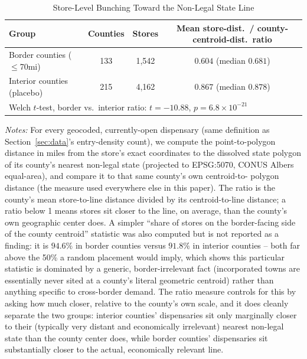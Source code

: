 \begin{table}[htbp]
\centering
\caption{Store-Level Bunching Toward the Non-Legal State Line}
\label{tab:border_bunching}
\begin{tabular}{lccc}
\toprule
Group & Counties & Stores & Mean store-dist.\ / county-centroid-dist.\ ratio \\
\midrule
Border counties ($\le$70mi) & 133 & 1{,}542 & $0.604$ (median $0.681$) \\
Interior counties (placebo) & 215 & 4{,}162 & $0.867$ (median $0.878$) \\
\midrule
\multicolumn{4}{l}{Welch $t$-test, border vs.\ interior ratio: $t=-10.88$, $p=6.8\times10^{-21}$} \\
\bottomrule
\end{tabular}
\begin{minipage}{0.95\textwidth}
\vspace{0.3em}
\footnotesize
\textit{Notes:} For every geocoded, currently-open dispensary (same definition as
Section~\ref{sec:data}'s entry-density count), we compute the point-to-polygon distance in miles from the
store's exact coordinates to the dissolved state polygon of its county's nearest non-legal state
(projected to EPSG:5070, CONUS Albers equal-area), and compare it to that same county's own centroid-to-
polygon distance (the measure used everywhere else in this paper). The ratio is the county's mean
store-to-line distance divided by its centroid-to-line distance; a ratio below 1 means stores sit closer to
the line, on average, than the county's own geographic center does. A simpler ``share of stores on the
border-facing side of the county centroid'' statistic was also computed but is not reported as a finding:
it is $94.6\%$ in border counties versus $91.8\%$ in interior counties -- both far above the 50\% a random
placement would imply, which shows this particular statistic is dominated by a generic, border-irrelevant
fact (incorporated towns are essentially never sited at a county's literal geometric centroid) rather than
anything specific to cross-border demand. The ratio measure controls for this by asking how much closer,
relative to the county's own scale, and it does cleanly separate the two groups: interior counties'
dispensaries sit only marginally closer to their (typically very distant and economically irrelevant)
nearest non-legal state than the county center does, while border counties' dispensaries sit
substantially closer to the actual, economically relevant line.
\end{minipage}
\end{table}
